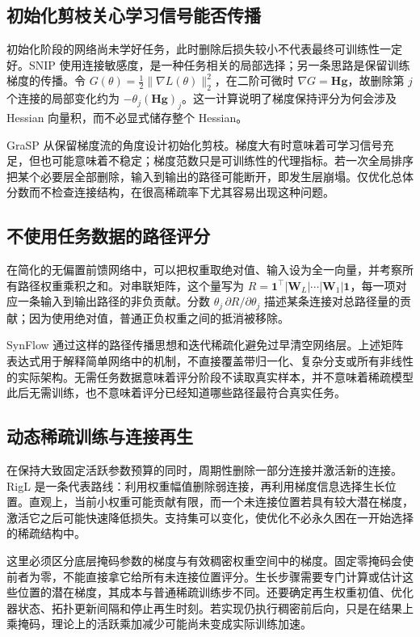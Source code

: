 \documentclass[UTF8,12pt,a4paper,fontset=fandol]{ctexart}
\begin{document}
\subsection{初始化剪枝关心学习信号能否传播}
初始化阶段的网络尚未学好任务，此时删除后损失较小不代表最终可训练性一定好。SNIP 使用连接敏感度，是一种任务相关的局部选择；另一条思路是保留训练梯度的传播。令 $G(\theta)=\tfrac12\|\nabla L(\theta)\|_2^2$，在二阶可微时 $\nabla G=\mathbf H\mathbf g$，故删除第 $j$ 个连接的局部变化约为 $-\theta_j(\mathbf H\mathbf g)_j$。这一计算说明了梯度保持评分为何会涉及 Hessian 向量积，而不必显式储存整个 Hessian。

GraSP 从保留梯度流的角度设计初始化剪枝\cite{wang2020}。梯度大有时意味着可学习信号充足，但也可能意味着不稳定；梯度范数只是可训练性的代理指标。若一次全局排序把某个必要层全部删除，输入到输出的路径可能断开，即发生层崩塌。仅优化总体分数而不检查连接结构，在很高稀疏率下尤其容易出现这种问题。

\subsection{不使用任务数据的路径评分}
在简化的无偏置前馈网络中，可以把权重取绝对值、输入设为全一向量，并考察所有路径权重乘积之和。对串联矩阵，这个量写为 $R=\mathbf 1^\top|\mathbf W_L|\cdots|\mathbf W_1|\mathbf 1$，每一项对应一条输入到输出路径的非负贡献。分数 $\theta_j\,\partial R/\partial\theta_j$ 描述某条连接对总路径量的贡献；因为使用绝对值，普通正负权重之间的抵消被移除。

SynFlow 通过这样的路径传播思想和迭代稀疏化避免过早清空网络层\cite{tanaka2020}。上述矩阵表达式用于解释简单网络中的机制，不直接覆盖带归一化、复杂分支或所有非线性的实际架构。无需任务数据意味着评分阶段不读取真实样本，并不意味着稀疏模型此后无需训练，也不意味着评分已经知道哪些路径最符合真实任务。

\subsection{动态稀疏训练与连接再生}
在保持大致固定活跃参数预算的同时，周期性删除一部分连接并激活新的连接。RigL 是一条代表路线：利用权重幅值删除弱连接，再利用梯度信息选择生长位置\cite{evci2020}。直观上，当前小权重可能贡献有限，而一个未连接位置若具有较大潜在梯度，激活它之后可能快速降低损失。支持集可以变化，使优化不必永久困在一开始选择的稀疏结构中。

这里必须区分底层掩码参数的梯度与有效稠密权重空间中的梯度。固定零掩码会使前者为零，不能直接拿它给所有未连接位置评分。生长步骤需要专门计算或估计这些位置的潜在梯度，其成本与普通稀疏训练步不同。还要确定再生权重初值、优化器状态、拓扑更新间隔和停止再生时刻。若实现仍执行稠密前后向，只是在结果上乘掩码，理论上的活跃乘加减少可能尚未变成实际训练加速。
\end{document}
